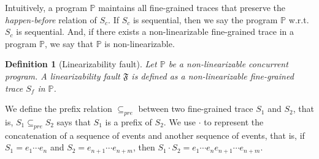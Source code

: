 \documentclass[runningheads]{llncs}
\newcommand{\p}{\mathbb{P} }
\newcommand{\ct}{S_c}
\newtheorem{myDef}{Definition}
\begin{document}
Intuitively, a program $\mathbb{P}$ maintains all %
fine-grained traces that preserve the \textit{happen-before} relation of $S_c$.
If $S_c$ is sequential, then we say the program $\p$ w.r.t. $\ct$ is sequential.
And, if there exists a non-linearizable fine-grained trace in a program $\p$, we say that $\p$ is non-linearizable.

\begin{myDef}[Linearizability fault]
Let $\p$ be a non-linearizable concurrent program. A \textit{linearizability fault} $\mathfrak{F}$ is defined as a non-linearizable fine-grained trace $S_f$ in $\p$.
\end{myDef}

We define the prefix relation $\subseteq_{pre}$ between two fine-grained trace $S_1$ and $S_2$, that is, $S_1\subseteq_{pre} S_2$ says that $S_1$ is a prefix of $S_2$. We use $\cdot$ to represent the concatenation of a sequence of events and another sequence of events, that is, if $S_1=e_1\cdots e_n$ and $S_2 = e_{n+1}\cdots e_{n+m}$, then $S_1\cdot S_2 = e_1\cdots e_n e_{n+1}\cdots e_{n+m}$.
\end{document}
